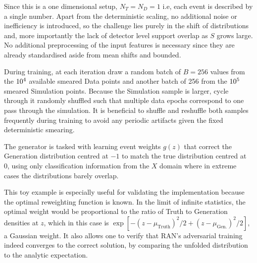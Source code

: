 {{            Since this is a one dimensional setup, \(N_T = N_D = 1\) i.e, each event is described by a single number.
            Apart from the deterministic scaling, no additional noise or inefficiency is introduced, so the challenge lies purely in the shift of distributions and, more importantly the lack of detector level support overlap as $S$ grows large.
            No additional preprocessing of the input features is necessary since they are already standardised aside from mean shifts and bounded.
            
            During training, at each iteration draw a random batch of $B=256$ values from the $\num{d4}$ available smeared Data points and another batch of 256 from the $\num{d5}$ smeared Simulation points.
            Because the Simulation sample is larger, cycle through it randomly shuffled such that multiple data epochs correspond to one pass through the simulation.
            It is beneficial to shuffle and reshuffle both samples frequently during training to avoid any periodic artifacts given the fixed deterministic smearing.
            
            The generator is tasked with learning event weights $g(z)$ that correct the Generation distribution centred at $-1$ to match the true distribution centred at 0, using only classification information from the $X$ domain where in extreme cases the distributions barely overlap.
            
            This toy example is especially useful for validating the implementation because the optimal reweighting function is known.
            In the limit of infinite statistics, the optimal weight would be proportional to the ratio of Truth to Generation densities at $z$, which in this case is $\exp[-(z-\mu_{\text{Truth}})^2/2 + (z-\mu_{\text{Gen.}})^2/2]$, a Gaussian weight.
            It also allows one to verify that RAN’s adversarial training indeed converges to the correct solution, by comparing the unfolded distribution to the analytic expectation.

}}

